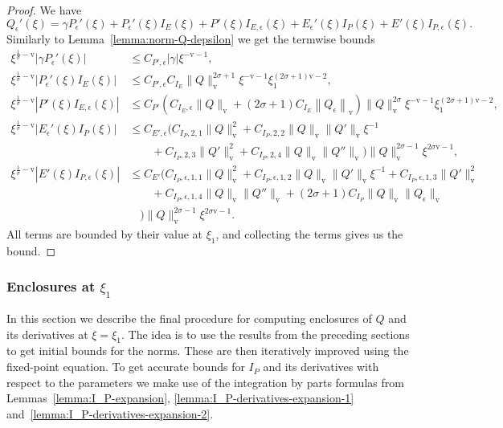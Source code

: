 \documentclass[11pt]{article}
\newcommand{\normv}{\mathrm{v}}
\begin{document}
\begin{proof}
  We have
  \begin{equation*}
    Q_{\epsilon}'(\xi)
    = \gamma P_{\epsilon}'(\xi)
    + P_{\epsilon}'(\xi)I_{E}(\xi)
    + P'(\xi)I_{E,\epsilon}(\xi)
    + E_{\epsilon}'(\xi)I_{P}(\xi)
    + E'(\xi)I_{P,\epsilon}(\xi).
  \end{equation*}
  Similarly to Lemma~\ref{lemma:norm-Q-depsilon} we get the termwise
  bounds
  \begin{align*}
    \xi^{\frac{1}{\sigma} - \normv}|\gamma P_{\epsilon}'(\xi)|
    &\leq C_{P',\epsilon}|\gamma|\xi^{-\normv - 1},\\
    \xi^{\frac{1}{\sigma} - \normv}|P_{\epsilon}'(\xi)I_{E}(\xi)|
    &\leq C_{P',\epsilon}C_{I_{E}}
      \|Q\|_{\normv}^{2\sigma + 1}\xi^{-\normv - 1}
      \xi_{1}^{(2\sigma + 1)\normv - 2},\\
    \xi^{\frac{1}{\sigma} - \normv}|P'(\xi)I_{E,\epsilon}(\xi)|
    &\leq C_{P'}(
      C_{I_{E},\epsilon}\|Q\|_{\normv}
      + (2\sigma + 1)C_{I_{E}}\left\|Q_{\epsilon}\right\|_{\normv}
      )\|Q\|_{\normv}^{2\sigma}\xi^{-\normv - 1}\xi_{1}^{(2\sigma + 1)\normv - 2},\\
    \xi^{\frac{1}{\sigma} - \normv}|E_{\epsilon}'(\xi)I_{P}(\xi)|
    &\leq C_{E',\epsilon}\Big(
      C_{I_{P},2,1}\|Q\|_{\normv}^{2}
      + C_{I_{P},2,2}\|Q\|_{\normv}\|Q'\|_{\normv}\xi^{-1}\\
    &\qquad+ C_{I_{P},2,3}\|Q'\|_{\normv}^{2}
      + C_{I_{P},2,4}\|Q\|_{\normv}\|Q''\|_{\normv}
      \Big)\|Q\|_{\normv}^{2\sigma - 1}
      \xi^{2\sigma\normv - 1},\\
    \xi^{\frac{1}{\sigma} - \normv}|E'(\xi)I_{P,\epsilon}(\xi)|
    &\leq C_{E'}\Big(C_{I_{P},\epsilon,1,1}\|Q\|_{\normv}^{2}
    + C_{I_{P},\epsilon,1,2}\|Q\|_{\normv}\|Q'\|_{\normv}\xi^{-1}
      + C_{I_{P},\epsilon,1,3}\|Q'\|_{\normv}^{2}\\
    &\qquad+ C_{I_{P},\epsilon,1,4}\|Q\|_{\normv}\|Q''\|_{\normv}
      + (2\sigma + 1)C_{I_{P}}\|Q\|_{\normv}\|Q_{\epsilon}\|_{\normv}\\
    &\quad\Big)\|Q\|_{\normv}^{2\sigma - 1}\xi^{2\sigma\normv - 1}.
  \end{align*}
  All terms are bounded by their value at \(\xi_{1}\), and collecting
  the terms gives us the bound.
\end{proof}

\subsubsection{Enclosures at \(\xi_{1}\)}
\label{sec:enclosures-xi-1}
In this section we describe the final procedure for computing
enclosures of \(Q\) and its derivatives at \(\xi = \xi_{1}\). The idea
is to use the results from the preceding sections to get initial
bounds for the norms. These are then iteratively improved using the
fixed-point equation. To get accurate bounds for \(I_{P}\) and its
derivatives with respect to the parameters we make use of the
integration by parts formulas from Lemmas~\ref{lemma:I_P-expansion},
\ref{lemma:I_P-derivatives-expansion-1}
and~\ref{lemma:I_P-derivatives-expansion-2}.
\end{document}
